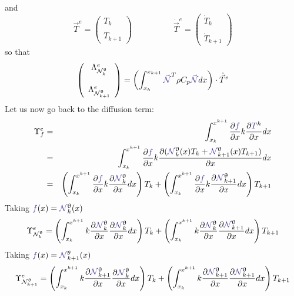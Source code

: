 and 
\[
{\vec T}^e = 
\left(
\begin{array}{c}
T_k \\ \\ T_{k+1}
\end{array}
\right)
\quad
\quad
\quad
\quad
\quad
\dot{\vec T}^e = 
\left(
\begin{array}{c}
\dot{T}_k \\ \\ \dot{T}_{k+1}
\end{array}
\right)
\]
so that 
\[
\left(
\begin{array}{c}
{\Lambda}_{\bN_k^\uptheta}^e \\  \\ 
{\Lambda}_{\bN_{k+1}^\uptheta}^e
\end{array}
\right)
=
\left( \int_{x_k}^{x_{k+1}}   
{\vec {\color{Violet}\bN}}^T \rho C_p  {\vec {\color{Violet}\bN}} dx  \right) \cdot \dot{\vec T}^e
\]
Let us now go back to the diffusion term:
\begin{eqnarray}
{\Upsilon}_f^e &=&
\int_{x_k}^{x^{k+1}} \frac{\partial {\color{Violet}f}}{\partial x} k 
\frac{\partial {\color{Violet}T}^h}{\partial x} dx \nn\\
&=&
\int_{x_k}^{x^{k+1}} \frac{\partial {\color{Violet}f}}{\partial x} k \frac{\partial  
({\color{Violet}\bN}_{k}^\uptheta(x) T_k 
+ {\color{Violet}\bN}_{k+1}^\uptheta(x) T_{k+1} ) }{\partial x} dx  \nn\\
&=&
\left( \int_{x_k}^{x^{k+1}} \frac{\partial {\color{Violet}f}}{\partial x}  
k \frac{\partial  {\color{Violet}\bN}_{k}^\uptheta } {\partial x}  dx \right)  T_k 
+ \left( \int_{x_k}^{x^{k+1}} \frac{\partial {\color{Violet}f}}{\partial x}  
k \frac{\partial  {\color{Violet}\bN}_{k+1}^\uptheta } {\partial x} dx \right) T_{k+1}  \nn
\end{eqnarray}
Taking ${\color{Violet}f}(x)={\color{Violet}\bN}_k^\uptheta(x)$ 
\[
{\Upsilon}_{\bN_k^\uptheta}^e=
\left( \int_{x_k}^{x^{k+1}} k\frac{\partial {\color{Violet}\bN}_k^\uptheta}{\partial x}  
\frac{\partial  {\color{Violet}\bN}_{k}^\uptheta } {\partial x}  dx \right)  T_k 
+ \left( \int_{x_k}^{x^{k+1}} k\frac{\partial {\color{Violet}\bN}_k^\uptheta}{\partial x}  
\frac{\partial  {\color{Violet}\bN}_{k+1}^\uptheta } {\partial x} dx \right) T_{k+1}  \nn
\]
Taking ${\color{Violet}f}(x)={\color{Violet}\bN}_{k+1}^\theta(x)$ 
\[
{\Upsilon}_{\bN_{k+1}^\uptheta}^e=
\left( \int_{x_k}^{x^{k+1}} k\frac{\partial {\color{Violet}\bN}_{k+1}^\uptheta}{\partial x}  
\frac{\partial  {\color{Violet}\bN}_{k}^\uptheta } {\partial x}  dx \right)  T_k 
+ 
\left( \int_{x_k}^{x^{k+1}} k\frac{\partial {\color{Violet}\bN}_{k+1}^\uptheta}{\partial x}  
\frac{\partial  {\color{Violet}\bN}_{k+1}^\uptheta } {\partial x} dx \right) T_{k+1}  \nn
\]


